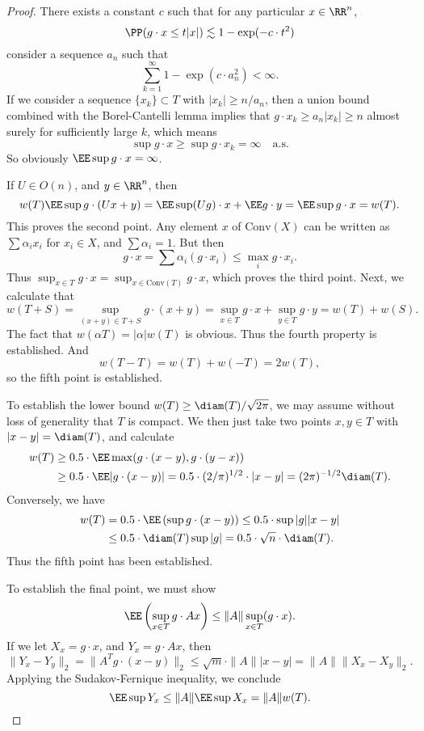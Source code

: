 \begin{proof}
	There exists a constant $c$ such that for any particular $x \in \RR^n$,
	\[ \PP(g \cdot x \leq t |x|) \lesssim 1 - \exp(-c \cdot t^2) \]
	consider a sequence $a_n$ such that
	\[ \sum_{k = 1}^\infty 1 - \exp(c \cdot a_n^2) < \infty. \]
	If we consider a sequence $\{ x_k \} \subset T$ with $|x_k| \geq n/a_n$, then a union bound combined with the Borel-Cantelli lemma implies that $g \cdot x_k \geq a_n |x_k| \geq n$ almost surely for sufficiently large $k$, which means
	\[ \sup g \cdot x \geq \sup g \cdot x_k = \infty\quad\text{a.s.} \]
	So obviously $\EE \sup g \cdot x = \infty$.

	If $U \in O(n)$, and $y \in \RR^n$, then
	\[ w(T) \EE \sup g \cdot (Ux + y) = \EE \sup (Ug) \cdot x + \EE g \cdot y = \EE \sup g \cdot x = w(T). \]
	This proves the second point. Any element $x$ of $\text{Conv}(X)$ can be written as $\sum \alpha_i x_i$ for $x_i \in X$, and $\sum \alpha_i = 1$. But then
	\[ g \cdot x = \sum \alpha_i (g \cdot x_i) \leq \max_i g \cdot x_i. \]
	Thus $\sup_{x \in T} g \cdot x = \sup_{x \in \text{Conv}(T)} g \cdot x$, which proves the third point. Next, we calculate that
	\[ w(T+S) =\sup_{(x + y) \in T + S} g \cdot (x+y) = \sup_{x \in T} g \cdot x + \sup_{y \in T} g \cdot y = w(T) + w(S). \]
	The fact that $w(\alpha T) = |\alpha| w(T)$ is obvious. Thus the fourth property is established. And
	\[ w(T-T) = w(T) + w(-T) = 2w(T), \]
	so the fifth point is established.

	To establish the lower bound $w(T) \geq \diam(T) / \sqrt{2\pi}$, we may assume without loss of generality that $T$ is compact. We then just take two points $x,y \in T$ with $|x-y| = \diam(T)$, and calculate
	\begin{align*}
		w(T) &\geq 0.5 \cdot \EE \max(g \cdot (x-y), g \cdot (y-x))\\
		&\geq 0.5 \cdot \EE |g \cdot (x-y)| = 0.5 \cdot (2/\pi)^{1/2} \cdot |x-y| = (2\pi)^{-1/2} \diam(T).
	\end{align*}
	Conversely, we have
	\begin{align*}
		w(T) &= 0.5 \cdot \EE \left( \sup g \cdot (x-y) \right) \leq 0.5 \cdot \sup |g| |x-y|\\
		&\leq 0.5 \cdot \diam(T) \sup |g| = 0.5 \cdot \sqrt{n} \cdot \diam(T).
	\end{align*}
	Thus the fifth point has been established.

	To establish the final point, we must show
	\[ \EE \left( \sup_{x \in T} g \cdot Ax \right) \leq \| A \| \sup_{x \in T} (g \cdot x). \]
	If we let $X_x = g \cdot x$, and $Y_x = g \cdot Ax$, then
	\[ \| Y_x - Y_y \|_2 = \| A^Tg \cdot (x-y) \|_2 \leq \sqrt{m} \cdot \| A \| |x - y| = \| A \| \| X_x - X_y \|_2. \]
	Applying the Sudakov-Fernique inequality, we conclude
	\[ \EE \sup Y_x \leq \| A \| \EE \sup X_x = \| A \| w(T). \qedhere \]
\end{proof}

